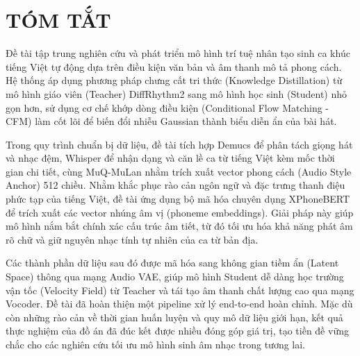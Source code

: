 \documentclass[a4paper,13pt,oneside]{report}
\begin{document}
\hypersetup{pageanchor=true}

\chapter*{TÓM TẮT}

Đề tài tập trung nghiên cứu và phát triển mô hình trí tuệ nhân tạo sinh ca khúc tiếng Việt tự động dựa trên điều kiện văn bản và âm thanh mô tả phong cách. Hệ thống áp dụng phương pháp chưng cất tri thức (Knowledge Distillation) từ mô hình giáo viên (Teacher) DiffRhythm2 sang mô hình học sinh (Student) nhỏ gọn hơn, sử dụng cơ chế khớp dòng điều kiện (Conditional Flow Matching - CFM) làm cốt lõi để biến đổi nhiễu Gaussian thành biểu diễn ẩn của bài hát.

Trong quy trình chuẩn bị dữ liệu, đề tài tích hợp Demucs để phân tách giọng hát và nhạc đệm, Whisper để nhận dạng và căn lề ca từ tiếng Việt kèm mốc thời gian chi tiết, cùng MuQ-MuLan nhằm trích xuất vector phong cách (Audio Style Anchor) 512 chiều. Nhằm khắc phục rào cản ngôn ngữ và đặc trưng thanh điệu phức tạp của tiếng Việt, đề tài ứng dụng bộ mã hóa chuyên dụng XPhoneBERT để trích xuất các vector nhúng âm vị (phoneme embeddings). Giải pháp này giúp mô hình nắm bắt chính xác cấu trúc âm tiết, từ đó tối ưu hóa khả năng phát âm rõ chữ và giữ nguyên nhạc tính tự nhiên của ca từ bản địa.

Các thành phần dữ liệu sau đó được mã hóa sang không gian tiềm ẩn (Latent Space) thông qua mạng Audio VAE, giúp mô hình Student dễ dàng học trường vận tốc (Velocity Field) từ Teacher và tái tạo âm thanh chất lượng cao qua mạng Vocoder. Đề tài đã hoàn thiện một pipeline xử lý end-to-end hoàn chỉnh. Mặc dù còn những rào cản về thời gian huấn luyện và quy mô dữ liệu giới hạn, kết quả thực nghiệm của đồ án đã đúc kết được nhiều đóng góp giá trị, tạo tiền đề vững chắc cho các nghiên cứu tối ưu mô hình sinh âm nhạc trong tương lai.
\newpage
\renewcommand*\contentsname{MỤC LỤC}
\tableofcontents
\clearpage

\renewcommand{\listfigurename}{DANH MỤC HÌNH VẼ}
\listoffigures
\clearpage

\renewcommand{\listtablename}{DANH MỤC BẢNG BIỂU}
\listoftables
\clearpage

\pagestyle{fancy}
\fancyhf{}
\fancyhead[R]{\leftmark}
\fancyfoot[R]{\thepage}
\end{document}
